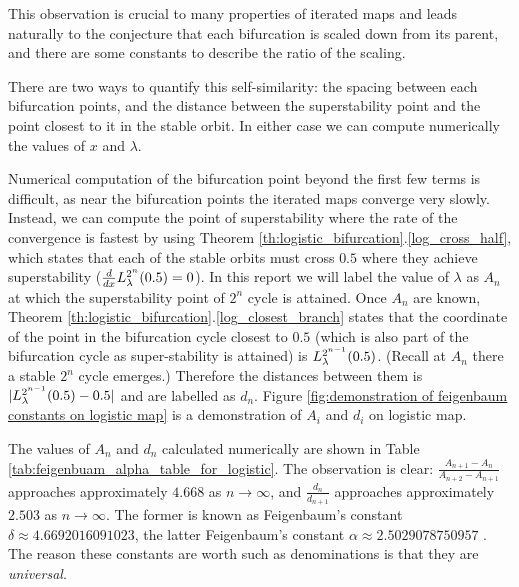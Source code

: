  This observation is crucial to many properties of iterated maps and leads naturally to the conjecture that each bifurcation is scaled down from its parent, and there are some constants to describe the ratio of the scaling. 

 There are two ways to quantify this self-similarity: the spacing between each bifurcation points, and the distance between the superstability point and the point closest to it in the stable orbit. 
 In either case we can compute numerically the values of $x$ and $\lambda$.

 Numerical computation of the bifurcation point beyond the first few terms is difficult, as near the bifurcation points the iterated maps converge very slowly.
 Instead, we can compute the point of superstability where the rate of the convergence is fastest by using Theorem \ref{th:logistic_bifurcation}.\ref{log_cross_half}, which states that each of the stable orbits must cross $0.5$ where they achieve superstability ($\frac{d}{dx}L_{\lambda}^{2^n}(0.5) = 0$).
In this report we will label the value of $\lambda$ as $A_n$ at which the superstability point of $2^n$ cycle is attained.
Once $A_n$ are known, Theorem \ref{th:logistic_bifurcation}.\ref{log_closest_branch} states that the coordinate of the point in the bifurcation cycle closest to $0.5$ (which is also part of the bifurcation cycle as super-stability is attained) is $L_{\lambda}^{2^{n-1}}(0.5)$. (Recall at $A_n$ there a stable $2^n$ cycle emerges.)
Therefore the distances between them is $|L_{\lambda}^{2^{n-1}}(0.5) - 0.5|$ and are labelled as $d_n$.
Figure \ref{fig:demonstration of feigenbaum constants on logistic map} is a demonstration of $A_i$ and $d_i$ on logistic map.

The values of $A_n$ and $d_n$ calculated numerically are shown in Table \ref{tab:feigenbuam_alpha_table_for_logistic}. 
The observation is clear:
$\frac{A_{n+1}-A_n}{A_{n+2}-A_{n+1}}$ approaches approximately $4.668$ as $n \rightarrow \infty$, and $\frac{d_n}{d_{n+1}}$ approaches approximately $2.503$ as $n \rightarrow \infty$. 
The former is known as Feigenbaum's constant $\delta \approx 4.6692016091023$, the latter Feigenbaum's constant $\alpha \approx 2.5029078750957$ \cite{F1}.
The reason these constants are worth such as denominations is that they are \emph{universal}.

